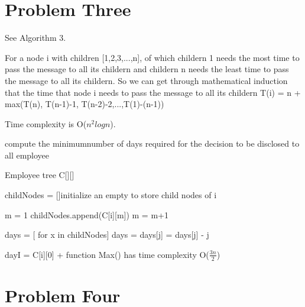 \documentclass[paper=a4, fontsize=11pt]{scrartcl} %
\numberwithin{equation}{section} %
\numberwithin{figure}{section} %
\numberwithin{table}{section} %
\begin{document}
\section{Problem Three}
See Algorithm 3. 

For a node i with children [1,2,3,...,n], of which childern 1 needs the most time to pass the message to all its childern and childern n needs the least time to pass the message to all its childern. So we can get through mathematical induction that the time that node i needs to pass the message to all its childern T(i) = n + max(T(n), T(n-1)-1, T(n-2)-2,...,T(1)-(n-1))

Time complexity is O($n^2logn$).

\begin{algorithm}
	\caption{ compute the minimumnumber of days required for the decision to be disclosed to all employee}
	\begin{algorithmic}[1]
		\Require Employee tree C[][]
            
            \State {}

            
			
        \EndFunction
        \State {}
        \EndIf
        \State childNodes = []\Comment initialize an empty to store child nodes of i
        
        \State m = 1
        \State childNodes.append(C[i][m])
        \State  m = m+1

        \EndWhile
        \EndIf
        \State days = [ for x in childNodes]
        \State days = 
        \State days[j] = days[j] - j

        \EndFor
        \State dayI = C[i][0] +  \Comment function Max() has time complexity O($\frac{3n}{2}$)
        \State {}
        
        
        

        \EndFunction
	\end{algorithmic}

\end{algorithm}

\section{Problem Four}
\end{document}
